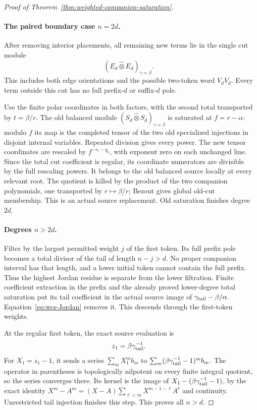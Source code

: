 \begin{proof}[Proof of Theorem~\ref{thm:weighted-companion-saturation}]
\paragraph{The paired boundary case \(n=2d\).}
After removing interior placements, all remaining new
terms lie in the single cut module
\[
                  (E_d\widehat\otimes E_d)_{\gamma=\beta}.
\]
This includes both edge orientations and the possible
two-token word \(V_dV_d\).  Every term outside this cut
has no full prefix-\(d\) or suffix-\(d\) pole.

Use the finite polar coordinates in both factors, with
the second total transported by \(t=\beta/r\).
The old balanced module
\((S_d\widehat\otimes S_d)_{\gamma=\beta}\)
is saturated at \(f=r-\alpha\): modulo \(f\) its map is
the completed tensor of the two old specialized
injections in disjoint internal variables.  Repeated
division gives every power.
The new tensor coordinates are rescaled by
\(f^{-r_i-q_a}\), with exponent zero on each unchanged
line.  Since the total cut coefficient is regular,
its coordinate numerators are divisible by the full
rescaling powers.  It belongs to the old balanced
source locally at every relevant root.  The quotient
is killed by the product of the two companion
polynomials, one transported by \(r\mapsto\beta/r\);
Bezout gives global old-cut membership.  This is an
actual source replacement.  Old saturation finishes
degree \(2d\).

\paragraph{Degrees \(n>2d\).}
Filter by the largest permitted weight \(j\) of the
first token.  Its full prefix pole becomes a total
divisor of the tail of length \(n-j>d\).  No proper
companion interval has that length, and a lower
initial token cannot contain the full prefix.
Thus the highest Jordan residue is separate from the
lower filtration.  Finite coefficient extraction in
the prefix and the already proved lower-degree total
saturation put its tail coefficient in the actual
source image of \(\gamma_{\rm tail}-\beta/\alpha\).
Equation~\eqref{eq:wcs-Jordan} removes it.  This descends
through the first-token weights.

At the regular first token, the exact source evaluation is
\[
 z_1=\beta\gamma_{\rm tail}^{-1}.
\]
For \(X_1=z_1-1\), it sends a series
\(\sum_m X_1^m b_m\) to
\(\sum_m(\beta\gamma_{\rm tail}^{-1}-1)^m b_m\).
The operator in parentheses is topologically nilpotent
on every finite integral quotient, so the series
converges there.  Its kernel is the image of
\(X_1-(\beta\gamma_{\rm tail}^{-1}-1)\), by the exact
identity \(X^m-A^m=(X-A)\sum_{\ell<m}X^{m-1-\ell}A^\ell\)
and continuity.  Unrestricted tail injection finishes
this step.  This proves all \(n>d\).


\end{proof}
